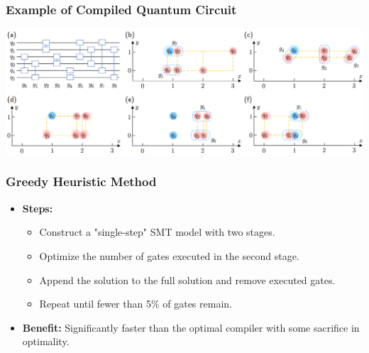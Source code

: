 \documentclass[18 pt]{beamer}
\begin{document}
\begin{frame}
    \frametitle{Example of Compiled Quantum Circuit}
    \begin{center}
        \includegraphics[width=\textwidth]{compile.png}
    \end{center}
\end{frame}
\begin{frame}
    \frametitle{Greedy Heuristic Method}
    \begin{itemize}
        \item \textbf{Steps:}
        \begin{itemize}
            \item Construct a "single-step" SMT model with two stages.
            \item Optimize the number of gates executed in the second stage.
            \item Append the solution to the full solution and remove executed gates.
            \item Repeat until fewer than 5\% of gates remain.
        \end{itemize}
        \item \textbf{Benefit:} Significantly faster than the optimal compiler with some sacrifice in optimality.
    \end{itemize}
\end{frame}
\end{document}
